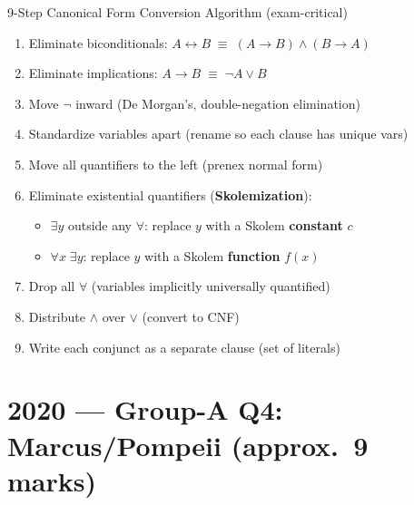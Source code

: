 \documentclass[12pt,a4paper]{article}
\newcommand{\ra}{\rightarrow}
\newcommand{\lra}{\leftrightarrow}
\begin{document}
\begin{algobox}{9-Step Canonical Form Conversion Algorithm (exam-critical)}
\begin{enumerate}[noitemsep,label=\textbf{Step \arabic*.}]
  \item Eliminate biconditionals: $A \lra B \;\equiv\; (A\ra B)\land(B\ra A)$
  \item Eliminate implications: $A \ra B \;\equiv\; \neg A \lor B$
  \item Move $\neg$ inward (De Morgan's, double-negation elimination)
  \item Standardize variables apart (rename so each clause has unique vars)
  \item Move all quantifiers to the left (prenex normal form)
  \item Eliminate existential quantifiers (\textbf{Skolemization}):
    \begin{itemize}[noitemsep]
      \item $\exists y$ outside any $\forall$: replace $y$ with a Skolem \textbf{constant} $c$
      \item $\forall x\;\exists y$: replace $y$ with a Skolem \textbf{function} $f(x)$
    \end{itemize}
  \item Drop all $\forall$ (variables implicitly universally quantified)
  \item Distribute $\land$ over $\lor$ (convert to CNF)
  \item Write each conjunct as a separate clause (set of literals)
\end{enumerate}
\end{algobox}

\newpage

\section{2020 --- Group-A Q4: Marcus/Pompeii (approx.\ 9 marks)}
\end{document}
